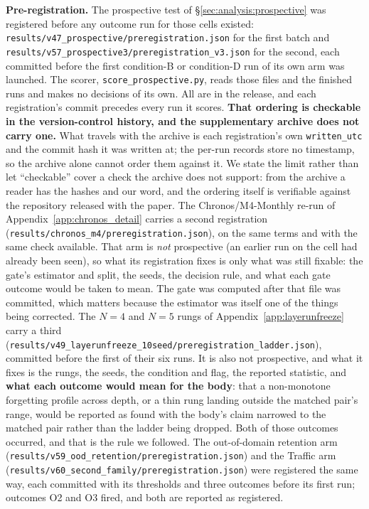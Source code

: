 \textbf{Pre-registration.}  The prospective test of
\S\ref{sec:analysis:prospective} was registered before any outcome run for
those cells existed: \texttt{results/v47\_prospective/preregistration.json} for
the first batch and \texttt{results/v57\_prospective3/preregistration\_v3.json}
for the second, each committed before the first condition-B or condition-D run
of its own arm was launched.  The scorer,
\texttt{score\_prospective.py}, reads those files and the finished runs and makes
no decisions of its own.  All are in the release, and each registration's commit
precedes every run it scores.  \textbf{That ordering is checkable in the
version-control history, and the supplementary archive does not carry one.}  What
travels with the archive is each registration's own \texttt{written\_utc} and the
commit hash it was written at; the per-run records store no timestamp, so the
archive alone cannot order them against it.  We state the limit rather than let
``checkable'' cover a check the archive does not support: from the archive a
reader has the hashes and our word, and the ordering itself is verifiable against
the repository released with the paper.  The Chronos/M4-Monthly re-run of
Appendix~\ref{app:chronos_detail} carries a second registration
(\texttt{results/chronos\_m4/preregistration.json}), on the same terms and with
the same check available.  That arm is \emph{not} prospective (an earlier run on
the cell had already been seen), so what its registration fixes is only what
was still fixable: the gate's estimator and split, the seeds, the decision rule,
and what each gate outcome would be taken to mean.  The gate was computed after
that file was committed, which matters because the estimator was itself one of
the things being corrected.
The $N{=}4$ and $N{=}5$ rungs of Appendix~\ref{app:layerunfreeze} carry a third
(\texttt{results/v49\_layerunfreeze\_10seed/preregistration\_ladder.json}),
committed before the first of their six runs.  It is also not prospective, and
what it fixes is the rungs, the seeds, the condition and flag, the reported
statistic, and \textbf{what each outcome would mean for the body}: that a
non-monotone forgetting profile across depth, or a thin rung landing outside the
matched pair's range, would be reported as found with the body's claim narrowed to
the matched pair rather than the ladder being dropped.  Both of those outcomes
occurred, and that is the rule we followed.  The out-of-domain retention arm
(\texttt{results/v59\_ood\_retention/preregistration.json}) and the Traffic arm
(\texttt{results/v60\_second\_family/preregistration.json}) were registered the
same way, each committed with its thresholds and three outcomes before its first
run; outcomes O2 and O3 fired, and both are reported as registered.

